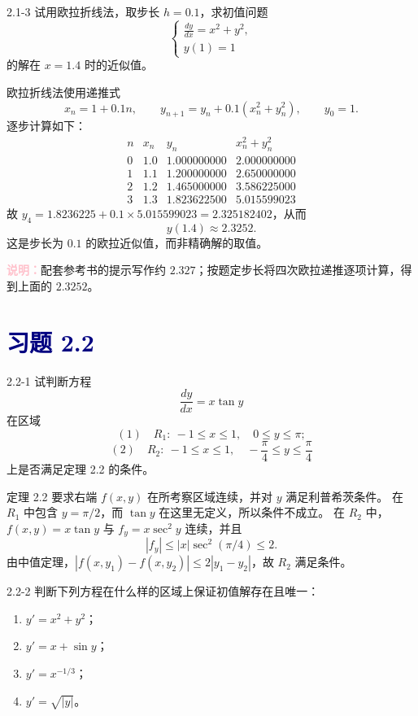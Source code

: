 \documentclass[UTF8,a4paper,11pt]{ctexart}
\newcommand{\note}[1]{\par\smallskip\noindent\textcolor{pink}{\bfseries 说明：}#1\par\smallskip}
\newcommand{\sect}[1]{\section*{\textcolor{navy}{习题 #1}}}
\begin{document}
\begin{problem}{2.1-3}
试用欧拉折线法，取步长 $h=0.1$，求初值问题
  \[
  \begin{cases}
    \displaystyle \frac{dy}{dx}=x^2+y^2,\\
    y(1)=1
  \end{cases}
  \]
  的解在 $x=1.4$ 时的近似值。
\end{problem}

\begin{solution}
欧拉折线法使用递推式
\[
x_n=1+0.1n,\qquad y_{n+1}=y_n+0.1(x_n^2+y_n^2),\qquad y_0=1.
\]
逐步计算如下：
\[
\begin{array}{c|c|c|c}
n&x_n&y_n&x_n^2+y_n^2\\\hline
0&1.0&1.000000000&2.000000000\\
1&1.1&1.200000000&2.650000000\\
2&1.2&1.465000000&3.586225000\\
3&1.3&1.823622500&5.015599023
\end{array}
\]
故 $y_4=1.8236225+0.1\times5.015599023=2.325182402$，从而
\[\boxed{y(1.4)\approx2.3252}.\]
这是步长为 $0.1$ 的欧拉近似值，而非精确解的取值。
\note{配套参考书的提示写作约 $2.327$；按题定步长将四次欧拉递推逐项计算，得到上面的 $2.3252$。}
\end{solution}

\sect{2.2}
\begin{problem}{2.2-1}
试判断方程
  \[
    \frac{dy}{dx}=x\tan y
  \]
  在区域
  \[
    (1)\quad R_1:\ -1\le x\le1,\quad 0\le y\le\pi;
  \]
  \[
    (2)\quad R_2:\ -1\le x\le1,\quad -\frac{\pi}{4}\le y\le\frac{\pi}{4}
  \]
  上是否满足定理 2.2 的条件。
\end{problem}

\begin{solution}
定理 2.2 要求右端 $f(x,y)$ 在所考察区域连续，并对 $y$ 满足利普希茨条件。
在 $R_1$ 中包含 $y=\pi/2$，而 $\tan y$ 在这里无定义，所以条件不成立。
在 $R_2$ 中，$f(x,y)=x\tan y$ 与 $f_y=x\sec^2y$ 连续，并且
\[
|f_y|\le |x|\sec^2(\pi/4)\le2.
\]
由中值定理，$|f(x,y_1)-f(x,y_2)|\le2|y_1-y_2|$，故 $R_2$ 满足条件。
\end{solution}

\begin{problem}{2.2-2}
判断下列方程在什么样的区域上保证初值解存在且唯一：
  \begin{enumerate}[label=(\arabic*)]
    \item $y'=x^2+y^2$；
    \item $y'=x+\sin y$；
    \item $y'=x^{-1/3}$；
    \item $y'=\sqrt{|y|}$。
  \end{enumerate}
\end{problem}
\end{document}
